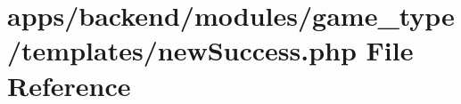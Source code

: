 \hypertarget{backend_2modules_2game__type_2templates_2new_success_8php}{\section{apps/backend/modules/game\-\_\-type/templates/new\-Success.php File Reference}
\label{backend_2modules_2game__type_2templates_2new_success_8php}
}
